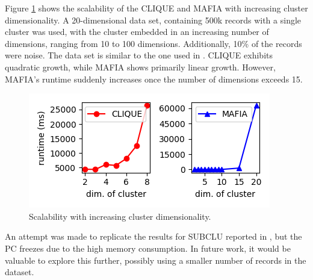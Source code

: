 Figure \ref{fig:cluster_dimensionality_vs_runtime} shows the scalability of the CLIQUE and MAFIA with increasing cluster dimensionality. A 20-dimensional data set, containing 500k records with a single cluster was used, with the cluster embedded in an increasing number of dimensions, ranging from 10 to 100 dimensions. Additionally, 10\% of the records were noise. The data set is similar to the one used in \cite{mafia}. CLIQUE exhibits quadratic growth, while MAFIA shows primarily linear growth. However, MAFIA's runtime suddenly increases once the number of dimensions exceeds 15.
\begin{figure}[H]
    \vspace*{-0.6cm}
    \centering
    \includegraphics[scale=0.5]{figures/cluster_dimensionality_vs_runtime.png}
    \caption{Scalability with increasing cluster dimensionality.}
    \label{fig:cluster_dimensionality_vs_runtime}
    \vspace*{-0.6cm}
\end{figure}

An attempt was made to replicate the results for SUBCLU reported in \cite{subclu}, but the PC freezes due to the high memory consumption. In future work, it would be valuable to explore this further, possibly using a smaller number of records in the dataset.


